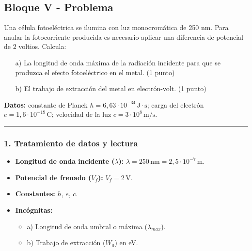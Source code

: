 \newpage

\subsection{Bloque V - Problema}
\label{subsec:B5_2010_sep_ext}

\begin{cajaenunciado}
Una célula fotoeléctrica se ilumina con luz monocromática de 250 nm. Para anular la fotocorriente producida es necesario aplicar una diferencia de potencial de 2 voltios. Calcula:
\begin{enumerate}
    \item[a)] La longitud de onda máxima de la radiación incidente para que se produzca el efecto fotoeléctrico en el metal. (1 punto)
    \item[b)] El trabajo de extracción del metal en electrón-volt. (1 punto)
\end{enumerate}
\textbf{Datos:} constante de Planck $h=6,63\cdot10^{-34}\,\text{J}\cdot\text{s}$; carga del electrón $e=1,6\cdot10^{-19}\,\text{C}$; velocidad de la luz $c=3\cdot10^{8}\,\text{m/s}$.
\end{cajaenunciado}
\hrule

\subsubsection*{1. Tratamiento de datos y lectura}
\begin{itemize}
    \item \textbf{Longitud de onda incidente ($\lambda$):} $\lambda = 250 \, \text{nm} = 2,5 \cdot 10^{-7} \, \text{m}$.
    \item \textbf{Potencial de frenado ($V_f$):} $V_f = 2 \, \text{V}$.
    \item \textbf{Constantes:} $h$, $e$, $c$.
    \item \textbf{Incógnitas:}
    \begin{itemize}
        \item a) Longitud de onda umbral o máxima ($\lambda_{max}$).
        \item b) Trabajo de extracción ($W_0$) en eV.
    \end{itemize}
\end{itemize}

